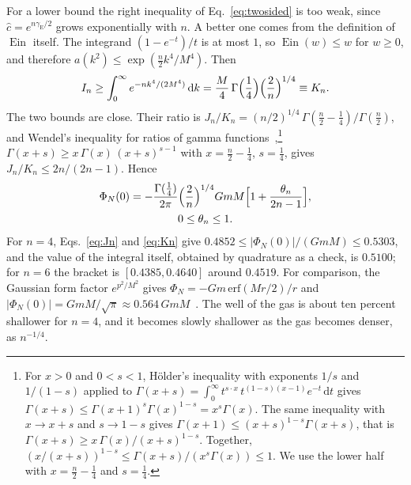 \documentclass[a4paper,11pt]{article}
\newcommand{\dd}{\mathrm{d}}
\newcommand{\Ein}{\operatorname{Ein}}
\newcommand{\gE}{\gamma_{\mathrm E}}
\begin{document}
For a lower bound the right inequality of Eq.~\eqref{eq:twosided} is too weak, since $\hat c=e^{n\gE/2}$ grows exponentially with $n$. A better one comes from the definition of $\Ein$ itself. The integrand $(1-e^{-t})/t$ is at most $1$, so $\Ein(w)\le w$ for $w\ge0$, and therefore $a(k^2)\le\exp(\frac n2k^4/M^4)$. Then
\begin{equation}
\label{eq:Kn}
I_n\ge\int_0^\infty e^{-nk^4/(2M^4)}\,\dd k=\frac M4\,\Gamma\Bigl(\frac14\Bigr)\Bigl(\frac2n\Bigr)^{1/4}\equiv K_n .
\end{equation}
The two bounds are close. Their ratio is $J_n/K_n=(n/2)^{1/4}\,\Gamma(\frac n2-\frac14)/\Gamma(\frac n2)$, and Wendel's inequality for ratios of gamma functions~\cite{Wendel1948},\footnote{For $x>0$ and $0<s<1$, H\"older's inequality with exponents $1/s$ and $1/(1-s)$ applied to $\Gamma(x+s)=\int_0^\infty t^{s\cdot x}\,t^{(1-s)(x-1)}e^{-t}\,\dd t$ gives $\Gamma(x+s)\le\Gamma(x+1)^s\Gamma(x)^{1-s}=x^s\Gamma(x)$. The same inequality with $x\to x+s$ and $s\to1-s$ gives $\Gamma(x+1)\le(x+s)^{1-s}\Gamma(x+s)$, that is $\Gamma(x+s)\ge x\,\Gamma(x)/(x+s)^{1-s}$. Together, $(x/(x+s))^{1-s}\le\Gamma(x+s)/(x^s\Gamma(x))\le1$. We use the lower half with $x=\frac n2-\frac14$ and $s=\frac14$.} $\Gamma(x+s)\ge x\,\Gamma(x)\,(x+s)^{s-1}$ with $x=\frac n2-\frac14$, $s=\frac14$, gives $J_n/K_n\le 2n/(2n-1)$. Hence
\begin{equation}
\label{eq:pot0-sharp}
\begin{gathered}
\Phi_N(0)=-\frac{\Gamma(\frac14)}{2\pi}\Bigl(\frac2n\Bigr)^{1/4}GmM\Bigl[1+\frac{\theta_n}{2n-1}\Bigr],\\
0\le\theta_n\le1 .
\end{gathered}
\end{equation}
For $n=4$, Eqs.~\eqref{eq:Jn} and \eqref{eq:Kn} give $0.4852\le|\Phi_N(0)|/(GmM)\le0.5303$, and the value of the integral itself, obtained by quadrature as a check, is $0.5100$; for $n=6$ the bracket is $[0.4385,0.4640]$ around $0.4519$. For comparison, the Gaussian form factor $e^{p^2/M^2}$ gives $\Phi_N=-Gm\,\mathrm{erf}(Mr/2)/r$ and $|\Phi_N(0)|=GmM/\sqrt\pi\approx0.564\,GmM$~\cite{BGKM2012,EdholmKoshelevMazumdar2016}. The well of the gas is about ten percent shallower for $n=4$, and it becomes slowly shallower as the gas becomes denser, as $n^{-1/4}$.
\end{document}
